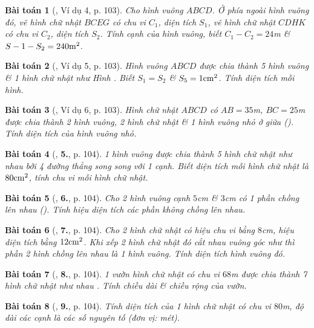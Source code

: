\documentclass{article}
\numberwithin{equation}{section}
\newtheorem{baitoan}{Bài toán}[section]
\begin{document}
\begin{baitoan}[\cite{Binh_Toan_6_tap_1}, Ví dụ 4, p. 103]
	Cho hình vuông $ABCD$. Ở phía ngoài hình vuông đó, vẽ hình chữ nhật $BCEG$ có chu vi $C_1$, diện tích $S_1$, vẽ hình chữ nhật $CDHK$ có chu vi $C_2$, diện tích $S_2$. Tính cạnh của hình vuông, biết $C_1 - C_2 = 24$\emph{m} \& $S-1 - S_2 = 240{\rm m}^2$.
\end{baitoan}

\begin{baitoan}[\cite{Binh_Toan_6_tap_1}, Ví dụ 5, p. 103]
	Hình vuông $ABCD$ được chia thành 5 hình vuông \& 1 hình chữ nhật như Hình \cite[Hình 24a, p. 103]{Binh_Toan_6_tap_1}. Biết $S_1 = S_2$ \& $S_5 = 1{\rm cm}^2$. Tính diện tích mỗi hình.
\end{baitoan}

\begin{baitoan}[\cite{Binh_Toan_6_tap_1}, Ví dụ 6, p. 103]
	Hình chữ nhật $ABCD$ có $AB = 35$\emph{m}, $BC = 25$\emph{m} được chia thành 2 hình vuông, 2 hình chữ nhật \& 1 hình vuông nhỏ ở giữa (\cite[Hình 25, p. 103]{Binh_Toan_6_tap_1}). Tính diện tích của hình vuông nhỏ.
\end{baitoan}

\begin{baitoan}[\cite{Binh_Toan_6_tap_1}, \textbf{5.}, p. 104]
	1 hình vuông được chia thành 5 hình chữ nhật như nhau bởi 4 đường thẳng song song với 1 cạnh. Biết diện tích mỗi hình chữ nhật là $80{\rm cm}^2$, tính chu vi mỗi hình chữ nhật.
\end{baitoan}

\begin{baitoan}[\cite{Binh_Toan_6_tap_1}, \textbf{6.}, p. 104]
	Cho 2 hình vuông cạnh $5$\emph{cm} \& $3$\emph{cm} có 1 phần chồng lên nhau (\cite[Hình 27, p. 104]{Binh_Toan_6_tap_1}). Tính hiệu diện tích các phần không chồng lên nhau.
\end{baitoan}

\begin{baitoan}[\cite{Binh_Toan_6_tap_1}, \textbf{7.}, p. 104]
	Cho 2 hình chữ nhật có hiệu chu vi bằng $8$\emph{cm}, hiệu diện tích bằng $12{\rm cm}^2$. Khi xếp 2 hình chữ nhật đó cắt nhau vuông góc như \cite[Hình 28, p. 104]{Binh_Toan_6_tap_1} thì phần 2 hình chồng lên nhau là 1 hình vuông. Tính diện tích hình vuông đó.
\end{baitoan}

\begin{baitoan}[\cite{Binh_Toan_6_tap_1}, \textbf{8.}, p. 104]
	1 vườn hình chữ nhật có chu vi $68$\emph{m} được chia thành 7 hình chữ nhật như nhau \cite[Hình 29, p. 104]{Binh_Toan_6_tap_1}. Tính chiều dài \& chiều rộng của vườn.
\end{baitoan}

\begin{baitoan}[\cite{Binh_Toan_6_tap_1}, \textbf{9.}, p. 104]
	Tính diện tích của 1 hình chữ nhật có chu vi $80$\emph{m}, độ dài các cạnh là các số nguyên tố (đơn vị: mét).
\end{baitoan}


\printbibliography[heading=bibintoc]
	
\end{document}

